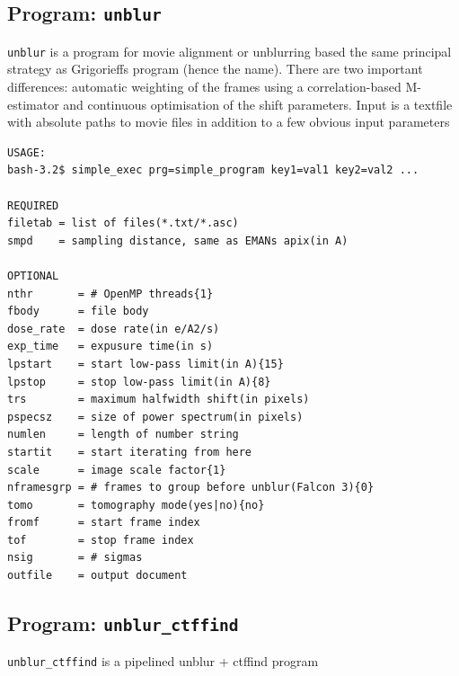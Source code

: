 \documentclass[a4paper,11pt]{article}
\newcommand{\prgname}[1]{\textcolor{NavyBlue}{\texttt{#1}}}
\begin{document}
\subsection{Program: \prgname{unblur}}
\label{unblur}
\prgname{unblur} is a program for movie alignment or unblurring based the same principal strategy as Grigorieffs program (hence the name). There are two important differences: automatic weighting of the frames using a correlation-based M-estimator and continuous optimisation of the shift parameters. Input is a textfile with absolute paths to movie files in addition to a few obvious input parameters

\begin{verbatim}
USAGE:
bash-3.2$ simple_exec prg=simple_program key1=val1 key2=val2 ...

REQUIRED
filetab = list of files(*.txt/*.asc)
smpd    = sampling distance, same as EMANs apix(in A)

OPTIONAL
nthr       = # OpenMP threads{1}
fbody      = file body
dose_rate  = dose rate(in e/A2/s)
exp_time   = expusure time(in s)
lpstart    = start low-pass limit(in A){15}
lpstop     = stop low-pass limit(in A){8}
trs        = maximum halfwidth shift(in pixels)
pspecsz    = size of power spectrum(in pixels)
numlen     = length of number string
startit    = start iterating from here
scale      = image scale factor{1}
nframesgrp = # frames to group before unblur(Falcon 3){0}
tomo       = tomography mode(yes|no){no}
fromf      = start frame index
tof        = stop frame index
nsig       = # sigmas
outfile    = output document
\end{verbatim}

\subsection{Program: \prgname{unblur\_ctffind}}
\label{unblur_ctffind}
\prgname{unblur\_ctffind} is a pipelined unblur + ctffind program
\end{document}
